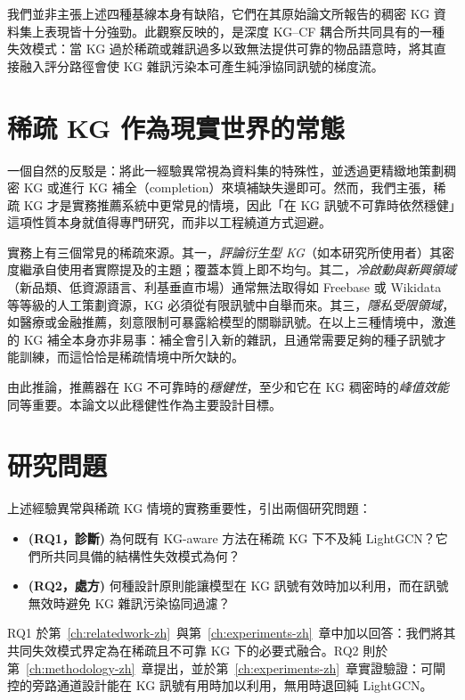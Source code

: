 我們並非主張上述四種基線本身有缺陷，它們在其原始論文所報告的稠密 KG 資料集上表現皆十分強勁。此觀察反映的，是深度 KG--CF 耦合所共同具有的一種失效模式：當 KG 過於稀疏或雜訊過多以致無法提供可靠的物品語意時，將其直接融入評分路徑會使 KG 雜訊污染本可產生純淨協同訊號的梯度流。

\section{稀疏 KG 作為現實世界的常態}
\label{sec:intro-sparse-kg-zh}

一個自然的反駁是：將此一經驗異常視為資料集的特殊性，並透過更精緻地策劃稠密 KG 或進行 KG 補全（completion）來填補缺失邊即可。然而，我們主張，稀疏 KG 才是實務推薦系統中更常見的情境，因此「在 KG 訊號不可靠時依然穩健」這項性質本身就值得專門研究，而非以工程繞道方式迴避。

實務上有三個常見的稀疏來源。其一，\emph{評論衍生型 KG}（如本研究所使用者）其密度繼承自使用者實際提及的主題；覆蓋本質上即不均勻。其二，\emph{冷啟動與新興領域}（新品類、低資源語言、利基垂直市場）通常無法取得如 Freebase 或 Wikidata 等等級的人工策劃資源，KG 必須從有限訊號中自舉而來。其三，\emph{隱私受限領域}，如醫療或金融推薦，刻意限制可暴露給模型的關聯訊號。在以上三種情境中，激進的 KG 補全本身亦非易事：補全會引入新的雜訊，且通常需要足夠的種子訊號才能訓練，而這恰恰是稀疏情境中所欠缺的。

由此推論，推薦器在 KG 不可靠時的\emph{穩健性}，至少和它在 KG 稠密時的\emph{峰值效能}同等重要。本論文以此穩健性作為主要設計目標。

\section{研究問題}
\label{sec:intro-rq-zh}

上述經驗異常與稀疏 KG 情境的實務重要性，引出兩個研究問題：

\begin{itemize}
  \item \textbf{(RQ1，診斷)} 為何既有 KG-aware 方法在稀疏 KG 下不及純 LightGCN？它們所共同具備的結構性失效模式為何？
  \item \textbf{(RQ2，處方)} 何種設計原則能讓模型在 KG 訊號有效時加以利用，而在訊號無效時避免 KG 雜訊污染協同過濾？
\end{itemize}

RQ1 於第~\ref{ch:relatedwork-zh}~與第~\ref{ch:experiments-zh}~章中加以回答：我們將其共同失效模式界定為在稀疏且不可靠 KG 下的必要式融合。RQ2 則於第~\ref{ch:methodology-zh}~章提出，並於第~\ref{ch:experiments-zh}~章實證驗證：可閘控的旁路通道設計能在 KG 訊號有用時加以利用，無用時退回純 LightGCN。

